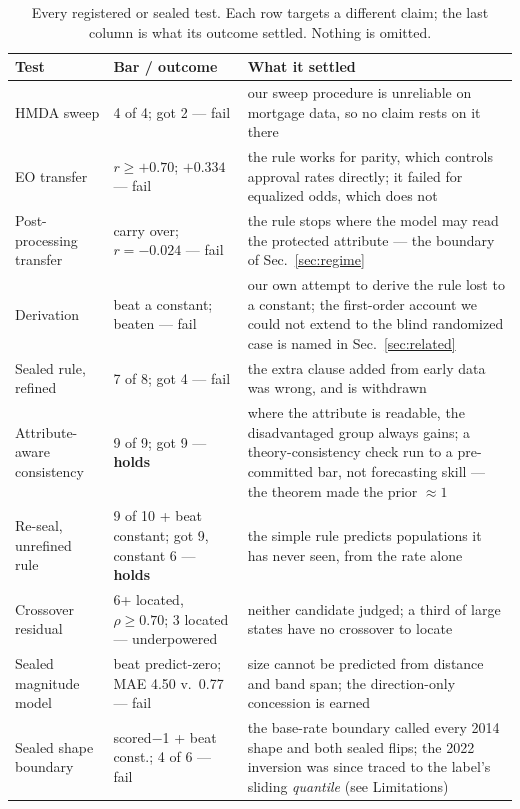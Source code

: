 \documentclass[9pt,conference]{IEEEtran}
\begin{document}
\begin{table}[t]
\caption{Every registered or sealed test. Each row targets a different claim; the last
column is what its outcome settled. Nothing is omitted.}
\label{tab:registered}
\centering
\scriptsize
\setlength{\tabcolsep}{3pt}
\begin{tabular}{@{}p{2.35cm}p{1.55cm}p{3.6cm}@{}}
\toprule
\textbf{Test} & \textbf{Bar / outcome} & \textbf{What it settled} \\
\midrule
HMDA sweep & 4 of 4; got 2 --- fail & our sweep procedure is unreliable on mortgage data,
so no claim rests on it there \\
EO transfer & $r \geq +0.70$; $+0.334$ --- fail & the rule works for parity, which controls
approval rates directly; it failed for equalized odds, which does not \\
Post-processing transfer & carry over; $r = -0.024$ --- fail & the rule stops where the
model may read the protected attribute --- the boundary of Sec.~\ref{sec:regime} \\
Derivation & beat a constant; beaten --- fail & our own attempt to derive the rule lost
to a constant; the first-order account we could not extend to the blind randomized case is
named in Sec.~\ref{sec:related} \\
Sealed rule, refined & 7 of 8; got 4 --- fail & the extra clause added from early data was
wrong, and is withdrawn \\
Attribute-aware consistency & 9 of 9; got 9 --- \textbf{holds} & where the attribute is
readable, the disadvantaged group always gains; a theory-consistency check run to a
pre-committed bar, not forecasting skill --- the theorem made the prior $\approx 1$ \\
Re-seal, unrefined rule & 9 of 10 + beat constant; got 9, constant 6 --- \textbf{holds} &
the simple rule predicts populations it has never seen, from the rate alone \\
Crossover residual & 6+ located, $\rho \geq 0.70$; 3 located --- underpowered & neither
candidate judged; a third of large states have no crossover to locate \\
Sealed magnitude model & beat predict-zero; MAE 4.50 v.\ 0.77 --- fail & size cannot be
predicted from distance and band span; the direction-only concession is earned \\
Sealed shape boundary & scored$-$1 + beat const.; 4 of 6 --- fail & the base-rate boundary
called every 2014 shape and both sealed flips; the 2022 inversion was since traced to
the label's sliding \emph{quantile} (see Limitations) \\

\end{tabular}
\end{table}
\end{document}
